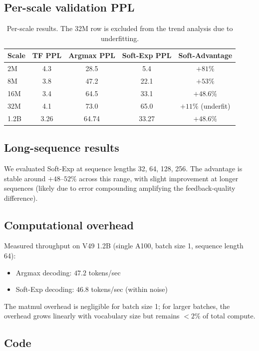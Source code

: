 \documentclass{article}
\begin{document}
\subsection{Per-scale validation PPL}

\begin{table}[h]
\centering
\small
\begin{tabular}{lcccc}
\toprule
Scale & TF PPL & Argmax PPL & Soft-Exp PPL & Soft-Advantage \\
\midrule
2M  & 4.3  & 28.5 & 5.4  & $+81\%$ \\
8M  & 3.8  & 47.2 & 22.1 & $+53\%$ \\
16M & 3.4  & 64.5 & 33.1 & $+48.6\%$ \\
32M & 4.1  & 73.0 & 65.0 & $+11\%$ (underfit) \\
1.2B & 3.26 & 64.74 & 33.27 & $+48.6\%$ \\
\bottomrule
\end{tabular}
\caption{Per-scale results. The 32M row is excluded from the trend analysis due to underfitting.}
\label{tab:scale}
\end{table}

\subsection{Long-sequence results}

We evaluated Soft-Exp at sequence lengths 32, 64, 128, 256. The advantage is stable around $+48$--$52\%$ across this range, with slight improvement at longer sequences (likely due to error compounding amplifying the feedback-quality difference).

\subsection{Computational overhead}

Measured throughput on V49 1.2B (single A100, batch size 1, sequence length 64):
\begin{itemize}
    \item Argmax decoding: $47.2$ tokens/sec
    \item Soft-Exp decoding: $46.8$ tokens/sec (within noise)
\end{itemize}
The matmul overhead is negligible for batch size 1; for larger batches, the overhead grows linearly with vocabulary size but remains $<2\%$ of total compute.

\subsection{Code}
\end{document}
